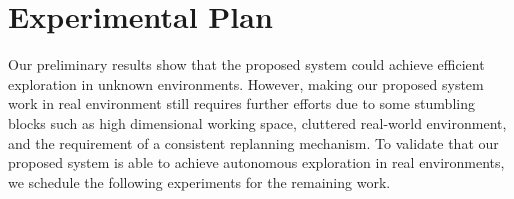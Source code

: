 \vspace{-15pt}
\section{Experimental Plan}\label{sec:experiments}%

Our preliminary results show that the proposed system could achieve efficient exploration in unknown environments.
However, making our proposed system work in real environment still requires further efforts due to some stumbling blocks such as high dimensional working space, cluttered real-world environment, and the requirement of a  consistent replanning mechanism.
To validate that our proposed system is able to achieve autonomous exploration in real environments, we schedule the following experiments for the remaining work.

